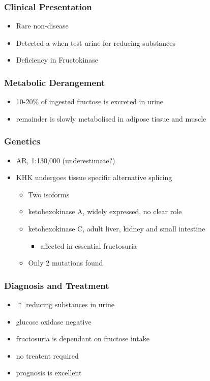 \documentclass{scrartcl}
\begin{document}
\subsubsection{Clinical Presentation}
\label{sec:org0b76c9f}
\begin{itemize}
\item Rare non-disease
\item Detected a when test urine for reducing substances
\item Deficiency in Fructokinase
\end{itemize}
\subsubsection{Metabolic Derangement}
\label{sec:orgb4afca4}
\begin{itemize}
\item 10-20\% of ingested fructose is excreted in urine
\item remainder is slowly metabolised in adipose tissue and muscle
\end{itemize}
\subsubsection{Genetics}
\label{sec:orgf154a0e}
\begin{itemize}
\item AR, 1:130,000 (underestimate?)
\item KHK undergoes tissue specific alternative splicing
\begin{itemize}
\item Two isoforms
\item ketohexokinase A, widely expressed, no clear role
\item ketohexokinase C, adult liver, kidney and small intestine
\begin{itemize}
\item affected in essential fructosuria
\end{itemize}
\item Only 2 mutations found
\end{itemize}
\end{itemize}
\subsubsection{Diagnosis and Treatment}
\label{sec:orgc395f17}
\begin{itemize}
\item \(\uparrow\) reducing substances in urine
\item glucose oxidase negative
\item fructosuria is dependant on fructose intake
\item no treatent required
\item prognosis is excellent
\end{itemize}
\end{document}
